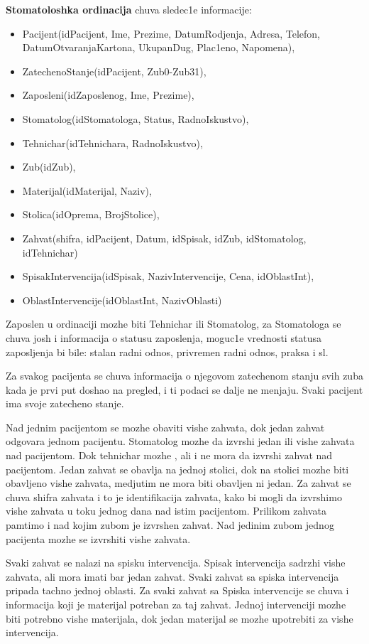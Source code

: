 \documentclass[10 pt]{article}
\begin{document}
\textbf{Stomatoloshka ordinacija} chuva sledec1e informacije:
\begin{itemize} 
	\item Pacijent(idPacijent, Ime, Prezime, DatumRodjenja, Adresa, Telefon, DatumOtvaranjaKartona, UkupanDug, Plac1eno, Napomena),
	\item ZatechenoStanje(idPacijent, Zub0-Zub31),
	\item Zaposleni(idZaposlenog, Ime, Prezime),
	\item Stomatolog(idStomatologa, Status, RadnoIskustvo),
	\item Tehnichar(idTehnichara, RadnoIskustvo), 
	\item Zub(idZub), 
	\item Materijal(idMaterijal, Naziv),
	\item Stolica(idOprema, BrojStolice), 
	\item Zahvat(shifra, idPacijent, Datum, idSpisak, idZub, idStomatolog,  idTehnichar) 
	\item SpisakIntervencija(idSpisak, NazivIntervencije, Cena, idOblastInt),
	\item OblastIntervencije(idOblastInt, NazivOblasti)
\end{itemize}

Zaposlen u ordinaciji mozhe biti Tehnichar ili Stomatolog, za Stomatologa se chuva josh i informacija o statusu zaposlenja, moguc1e vrednosti statusa zaposljenja bi bile: stalan radni odnos, privremen radni odnos, praksa i sl. 

Za svakog pacijenta se chuva informacija o njegovom zatechenom stanju svih zuba kada je prvi put doshao na pregled, i ti podaci se dalje ne menjaju. 
Svaki pacijent ima svoje zatecheno stanje.

Nad jednim pacijentom se mozhe obaviti vishe zahvata, dok jedan zahvat odgovara jednom pacijentu. Stomatolog mozhe da izvrshi jedan ili vishe zahvata nad pacijentom. Dok tehnichar mozhe , ali i ne mora da izvrshi zahvat nad pacijentom. Jedan zahvat se obavlja na jednoj stolici, dok na stolici mozhe biti obavljeno vishe zahvata, medjutim ne mora biti obavljen ni jedan. Za zahvat se chuva shifra zahvata i to je identifikacija zahvata, kako bi mogli da izvrshimo vishe zahvata u toku jednog dana nad istim pacijentom.  Prilikom zahvata pamtimo i nad kojim zubom je izvrshen zahvat. Nad jedinim zubom jednog pacijenta mozhe se izvrshiti vishe zahvata.

Svaki zahvat se nalazi na spisku intervencija. Spisak intervencija sadrzhi vishe zahvata, ali mora imati bar jedan zahvat. Svaki zahvat sa spiska intervencija pripada tachno jednoj oblasti. Za svaki zahvat sa Spiska intervencije se chuva i informacija koji je materijal potreban za taj zahvat. Jednoj intervenciji mozhe biti potrebno vishe materijala, dok jedan materijal se mozhe upotrebiti za vishe intervencija.
\end{document}
